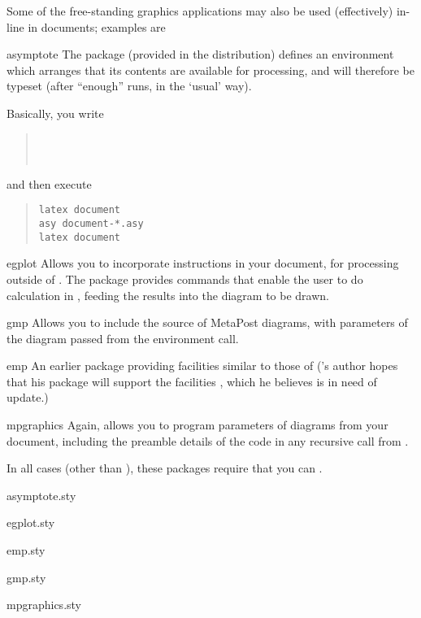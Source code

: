 
Some of the free-standing graphics applications may also be used
(effectively) in-line in \latex{} documents; examples are
\begin{booklist}
\item[asymptote]The package  (provided in the
   distribution) defines an environment
   which arranges that its contents are available for
  processing, and will therefore be typeset (after ``enough'' runs, in
  the `usual' \latex{} way).

  Basically, you write
  \begin{quote}
    \\
    \latexhtml{\hspace*{1em}}{~~}\texttt{}\\
  \end{quote}
  and then execute
\begin{quote}
\begin{verbatim}
latex document
asy document-*.asy
latex document
\end{verbatim}
\end{quote}
\item[egplot]Allows you to incorporate 
  instructions in your document, for processing outside of \latex{}.
  The package provides commands that enable the user to do calculation
  in , feeding the results into the diagram
  to be drawn.
\item[gmp]Allows you to include the source of MetaPost diagrams, with
  parameters of the diagram passed from the environment call.
\item[emp]An earlier package providing facilities similar to those of
   ('s author hopes that his package will
  support the facilities , which he believes is in need
  of update.)
\item[mpgraphics]Again, allows you to program parameters of \MP{}
  diagrams from your \latex{} document, including the preamble details
  of the \latex{} code in any recursive call from \MP{}.
\end{booklist}
In all cases (other than ), these packages require
that you can %
.
\begin{ctanrefs}
\item[asymptote.sty]
\item[egplot.sty]
\item[emp.sty]
\item[gmp.sty]
\item[mpgraphics.sty]
\end{ctanrefs}

